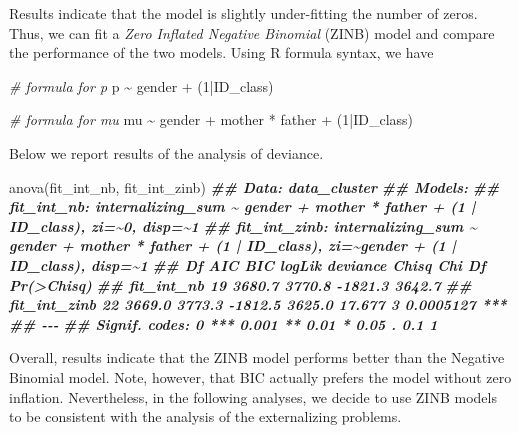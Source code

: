 \documentclass[
]{book}
\newenvironment{Shaded}{\begin{snugshade}}{\end{snugshade}}
\newcommand{\CommentTok}[1]{\textcolor[rgb]{0.56,0.35,0.01}{\textit{#1}}}
\newcommand{\DecValTok}[1]{\textcolor[rgb]{0.00,0.00,0.81}{#1}}
\newcommand{\DocumentationTok}[1]{\textcolor[rgb]{0.56,0.35,0.01}{\textbf{\textit{#1}}}}
\newcommand{\FunctionTok}[1]{\textcolor[rgb]{0.00,0.00,0.00}{#1}}
\newcommand{\NormalTok}[1]{#1}
\newcommand{\SpecialCharTok}[1]{\textcolor[rgb]{0.00,0.00,0.00}{#1}}
\begin{document}
Results indicate that the model is slightly under-fitting the number of zeros. Thus, we can fit a \emph{Zero Inflated Negative Binomial} (ZINB) model and compare the performance of the two models. Using R formula syntax, we have

\begin{Shaded}
\begin{Highlighting}[]
\CommentTok{\# formula for p}
\NormalTok{p }\SpecialCharTok{\textasciitilde{}}\NormalTok{ gender }\SpecialCharTok{+}\NormalTok{ (}\DecValTok{1}\SpecialCharTok{|}\NormalTok{ID\_class)}

\CommentTok{\# formula for mu}
\NormalTok{mu }\SpecialCharTok{\textasciitilde{}}\NormalTok{ gender }\SpecialCharTok{+}\NormalTok{ mother }\SpecialCharTok{*}\NormalTok{ father }\SpecialCharTok{+}\NormalTok{ (}\DecValTok{1}\SpecialCharTok{|}\NormalTok{ID\_class)}
\end{Highlighting}
\end{Shaded}

Below we report results of the analysis of deviance.

\begin{Shaded}
\begin{Highlighting}[]
\FunctionTok{anova}\NormalTok{(fit\_int\_nb, fit\_int\_zinb)}
\DocumentationTok{\#\# Data: data\_cluster}
\DocumentationTok{\#\# Models:}
\DocumentationTok{\#\# fit\_int\_nb: internalizing\_sum \textasciitilde{} gender + mother * father + (1 | ID\_class), zi=\textasciitilde{}0, disp=\textasciitilde{}1}
\DocumentationTok{\#\# fit\_int\_zinb: internalizing\_sum \textasciitilde{} gender + mother * father + (1 | ID\_class), zi=\textasciitilde{}gender + (1 | ID\_class), disp=\textasciitilde{}1}
\DocumentationTok{\#\#              Df    AIC    BIC  logLik deviance  Chisq Chi Df Pr(\textgreater{}Chisq)    }
\DocumentationTok{\#\# fit\_int\_nb   19 3680.7 3770.8 {-}1821.3   3642.7                             }
\DocumentationTok{\#\# fit\_int\_zinb 22 3669.0 3773.3 {-}1812.5   3625.0 17.677      3  0.0005127 ***}
\DocumentationTok{\#\# {-}{-}{-}}
\DocumentationTok{\#\# Signif. codes:  0 \textquotesingle{}***\textquotesingle{} 0.001 \textquotesingle{}**\textquotesingle{} 0.01 \textquotesingle{}*\textquotesingle{} 0.05 \textquotesingle{}.\textquotesingle{} 0.1 \textquotesingle{} \textquotesingle{} 1}
\end{Highlighting}
\end{Shaded}

Overall, results indicate that the ZINB model performs better than the Negative Binomial model. Note, however, that BIC actually prefers the model without zero inflation. Nevertheless, in the following analyses, we decide to use ZINB models to be consistent with the analysis of the externalizing problems.
\end{document}
